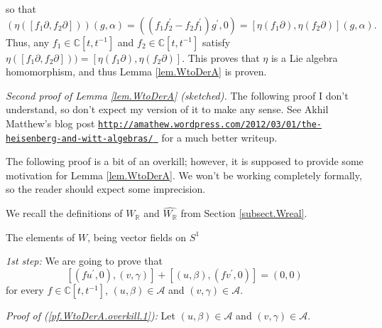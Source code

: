 \documentclass[etingof-lie.tex]{subfiles}
\begin{document}
so that
\[
\left(  \eta\left(  \left[  f_{1}\partial,f_{2}\partial\right]  \right)
\right)  \left(  g,\alpha\right)  =\left(  \left(  f_{1}f_{2}^{\prime}%
-f_{2}f_{1}^{\prime}\right)  g^{\prime},0\right)  =\left[  \eta\left(
f_{1}\partial\right)  ,\eta\left(  f_{2}\partial\right)  \right]  \left(
g,\alpha\right)  .
\]
Thus, any $f_{1}\in\mathbb{C}\left[  t,t^{-1}\right]  $ and $f_{2}%
\in\mathbb{C}\left[  t,t^{-1}\right]  $ satisfy $\eta\left(  \left[
f_{1}\partial,f_{2}\partial\right]  \right)  )=\left[  \eta\left(
f_{1}\partial\right)  ,\eta\left(  f_{2}\partial\right)  \right]  $. This
proves that $\eta$ is a Lie algebra homomorphism, and thus Lemma
\ref{lem.WtoDerA} is proven.

\textit{Second proof of Lemma \ref{lem.WtoDerA} (sketched).} The following
proof I don't understand, so don't expect my version of it to make any sense.
See Akhil Matthew's blog post \newline%
\texttt{\href{http://amathew.wordpress.com/2012/03/01/the-heisenberg-and-witt-algebras/}{\texttt{http://amathew.wordpress.com/2012/03/01/the-heisenberg-and-witt-algebras/}%
}} for a much better writeup.

The following proof is a bit of an overkill; however, it is supposed to
provide some motivation for Lemma \ref{lem.WtoDerA}. We won't be working
completely formally, so the reader should expect some imprecision.

\begin{noncompile}
We recall the definitions of $W_{\mathbb{R}}$ and $\widehat{W_{\mathbb{R}}}$
from Section \ref{subsect.Wreal}.
\end{noncompile}

\begin{noncompile}
The elements of $W$, being vector fields on $S^{1}$
\end{noncompile}

\begin{noncompile}
\textit{1st step:} We are going to prove that%
\begin{equation}
\left[  \left(  fu^{\prime},0\right)  ,\left(  v,\gamma\right)  \right]
+\left[  \left(  u,\beta\right)  ,\left(  fv^{\prime},0\right)  \right]
=\left(  0,0\right)  \label{pf.WtoDerA.overkill.1}%
\end{equation}
for every $f\in\mathbb{C}\left[  t,t^{-1}\right]  $, $\left(  u,\beta\right)
\in\mathcal{A}$ and $\left(  v,\gamma\right)  \in\mathcal{A}$.
\end{noncompile}

\begin{noncompile}
\textit{Proof of (\ref{pf.WtoDerA.overkill.1}):} Let $\left(  u,\beta\right)
\in\mathcal{A}$ and $\left(  v,\gamma\right)  \in\mathcal{A}$.
\end{noncompile}
\end{document}
